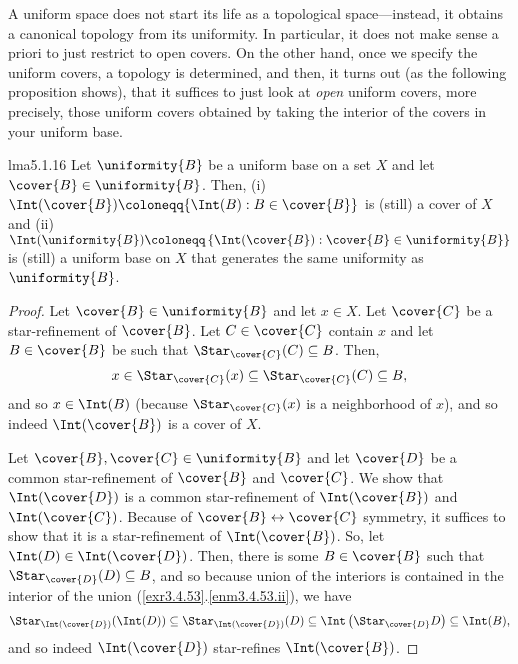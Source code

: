 A uniform space does not start its life as a topological space---instead, it obtains a canonical topology from its uniformity.  In particular, it does not make sense a priori to just restrict to open covers.  On the other hand, once we specify the uniform covers, a topology is determined, and then, it turns out (as the following proposition shows), that it suffices to just look at \emph{open} uniform covers, more precisely, those uniform covers obtained by taking the interior of the covers in your uniform base.
\begin{prp}{}{lma5.1.16}
Let $\uniformity{B}$ be a uniform base on a set $X$ and let $\cover{B}\in \uniformity{B}$.  Then, (i)~$\Int (\cover{B})\coloneqq \{ \Int (B):B\in \cover{B}\}$ is (still) a cover of $X$ and (ii)~$\Int (\uniformity{B})\coloneqq \left\{ \Int (\cover{B}):\cover{B}\in \uniformity{B}\right\}$ is (still) a uniform base on $X$ that generates the same uniformity as $\uniformity{B}$.
\begin{proof}
Let $\cover{B}\in \uniformity{B}$ and let $x\in X$.  Let $\cover{C}$ be a star-refinement of $\cover{B}$.  Let $C\in \cover{C}$ contain $x$ and let $B\in \cover{B}$ be such that $\Star _{\cover{C}}(C)\subseteq B$.  Then,
\begin{equation}
x\in \Star _{\cover{C}}(x)\subseteq \Star _{\cover{C}}(C)\subseteq B,
\end{equation}
and so $x\in \Int (B)$ (because $\Star _{\cover{C}}(x)$ is a neighborhood of $x$), and so indeed $\Int (\cover{B})$ is a cover of $X$.

Let $\cover{B},\cover{C}\in \uniformity{B}$ and let $\cover{D}$ be a common star-refinement of $\cover{B}$ and $\cover{C}$.  We show that $\Int (\cover{D})$ is a common star-refinement of $\Int (\cover{B})$ and $\Int (\cover{C})$.  Because of $\cover{B}\leftrightarrow \cover{C}$ symmetry, it suffices to show that it is a star-refinement of $\Int (\cover{B})$.  So, let $\Int (D)\in \Int (\cover{D})$.  Then, there is some $B\in \cover{B}$ such that $\Star _{\cover{D}}(D)\subseteq B$, and so because union of the interiors is contained in the interior of the union (\cref{exr3.4.53}.\cref{enm3.4.53.ii}), we have
\begin{equation}
\Star _{\Int (\cover{D})}(\Int (D))\subseteq \Star _{\Int (\cover{D})}(D)\subseteq \Int \left( \Star _{\cover{D}}D\right) \subseteq \Int (B),
\end{equation}
and so indeed $\Int (\cover{D})$ star-refines $\Int (\cover{B})$.


\end{proof}
\end{prp}
